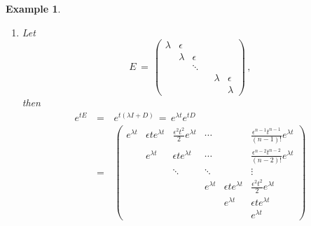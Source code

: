 \documentclass[12pt]{report}
\newtheorem{example}[theorem]{Example}
\begin{document}
\begin{example}
{\begin{enumerate}
\begin{eqnarray}
\begin{array}{cccccc}
\frac{\epsilon^{n-1} t^{n-1}}{(n-1)!}     \\ 
               &  1   & \epsilon t           &\cdots &   &  
\frac{\epsilon^{n-2}t^{n-2}}{(n-2)!}            \\
               &                 &\ddots                     & \ddots &  &     
\vdots\\
               &                 &                           & 1&  
\epsilon t      & \frac{\epsilon^2 t^2}{2}      \\
               &                 &                          &            & 
1&   \epsilon t        \\
              &                  &                          &           & 
               &  1      
\end{array}
\right)
\end{eqnarray}
\item Let 
$$
E\,=\, 
\left( \begin{array}{cccccc} 
\lambda &  \epsilon  &           &          &    &       \\ 
    &  \lambda  &   \epsilon      &          &     &   \\
    &       &\ddots&       &      &   \\
    &      &            &         & \lambda& \epsilon       \\
    &      &           &           &   &  \lambda      
\end{array} \right) \,, 
$$
then 
\begin{eqnarray}
e^{tE} \,&=&\, e^{t (\lambda I + D)} \,=\, e^{ \lambda t} e^{tD} \\
 \,&=&\, 
\left( \begin{array}{cccccc} 
e^{\lambda t}  &  \epsilon t e^{\lambda t}& \frac{\epsilon^2 t^2}{2}e^{\lambda t}&\cdots &   &  
\frac{\epsilon^{n-1}t^{n-1}}{(n-1)!} e^{\lambda t}    \\ 
               &  e^{\lambda t}  & \epsilon t e^{\lambda t}          &\cdots &   &  
\frac{\epsilon^{n-2} t^{n-2}}{(n-2)!} e^{\lambda t}           \\
               &                 &\ddots                     & \ddots &  &     
\vdots\\
               &                 &                           & e^{\lambda t}&  
\epsilon t e^{\lambda t}     & \frac{\epsilon^2 t^2}{2}  e^{\lambda t}    \\
               &                 &                          &            & 
e^{\lambda t}&   \epsilon t e^{\lambda t}       \\
              &                  &                          &           & 
               &  e^{\lambda t}      
\end{array}\right)
\end{eqnarray}
\end{enumerate}
}
\end{example}
\end{document}
